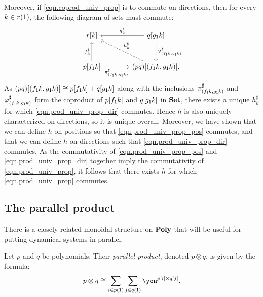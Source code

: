 \documentclass[Book-Poly]{subfiles}
\begin{document}
\begin{exercise}
\begin{solution}
Moreover, if \eqref{eqn.coprod_univ_prop} is to commute on directions, then for every $k \in r(\textsf{1})$, the following diagram of sets must commute:
\begin{equation} \label{eqn.prod_univ_prop_dir}
\begin{tikzcd}[sep=large]
	r[k] & q[g_\1k] \ar[l, "g^\sharp_k"'] \ar[d, "\varphi^\sharp_{(f_\1k, g_\1k)}"] \\
	p[f_\1k] \ar[u, "f^\sharp_k"] \ar[r, "\pi^\sharp_{(f_\1k, g_\1k)}"'] & (pq)[(f_\1k, g_\1k)]. \ar[ul, "h^\sharp_k"', dashed]
\end{tikzcd}
\end{equation}
As $(pq)[(f_{\textsf{1}}k, g_{\textsf{1}}k)] \cong p[f_{\textsf{1}}k] + q[g_{\textsf{1}}k]$ along with the inclusions $\pi^\sharp_{(f_{\textsf{1}}k, g_{\textsf{1}}k)}$ and $\varphi^\sharp_{(f_{\textsf{1}}k, g_{\textsf{1}}k)}$ form the coproduct of $p[f_{\textsf{1}}k]$ and $q[g_{\textsf{1}}k]$ in $\mathbf{Set}$, there exists a unique $h^\sharp_k$ for which \eqref{eqn.prod_univ_prop_dir} commutes.
Hence $h$ is also uniquely characterized on directions, so it is unique overall.
Moreover, we have shown that we can define $h$ on positions so that \eqref{eqn.prod_univ_prop_pos} commutes, and that we can define $h$ on directions such that \eqref{eqn.prod_univ_prop_dir} commutes.
As the commutativity of \eqref{eqn.prod_univ_prop_pos} and \eqref{eqn.prod_univ_prop_dir} together imply the commutativity of \eqref{eqn.prod_univ_prop}, it follows that there exists $h$ for which \eqref{eqn.prod_univ_prop} commutes.
\end{solution}
\end{exercise}

\subsection{The parallel product} \label{subsec.poly.cat.monoidal.par}
There is a closely related monoidal structure on $\mathbf{Poly}$ that will be useful for putting dynamical systems in parallel.

\begin{definition} \label{def.parallel}
Let $p$ and $q$ be polynomials. Their \emph{parallel product}, denoted $p\otimes q$, is given by the formula:
\begin{equation}\label{eqn.parallel_def}
p\otimes q\iso\sum_{i\in p(\1)}\sum_{j\in q(\1)}\yon^{p[i]\times q[j]}.
\end{equation}
\end{definition}
\end{document}
